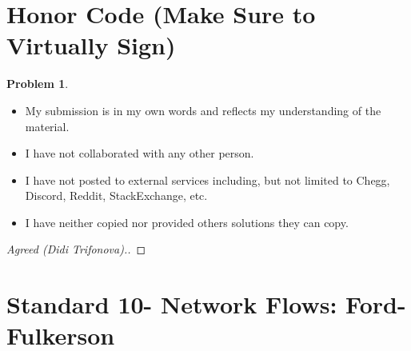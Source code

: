 \documentclass[11pt]{article}
\theoremstyle{definition}
\theoremstyle{definition}
\newtheorem{required}{Problem}
\theoremstyle{definition}
\begin{document}
\section{Honor Code (Make Sure to Virtually Sign)} \label{HonorCode}

\begin{required}
\noindent 
\begin{itemize}
\item My submission is in my own words and reflects my understanding of the material.
\item I have not collaborated with any other person.
\item I have not posted to external services including, but not limited to Chegg, Discord, Reddit, StackExchange, etc.
\item I have neither copied nor provided others solutions they can copy.
\end{itemize}

\end{required}

\begin{proof}[Agreed (Didi Trifonova).]
\end{proof}

\newpage
\section{Standard 10- Network Flows: Ford-Fulkerson}
\end{document}
